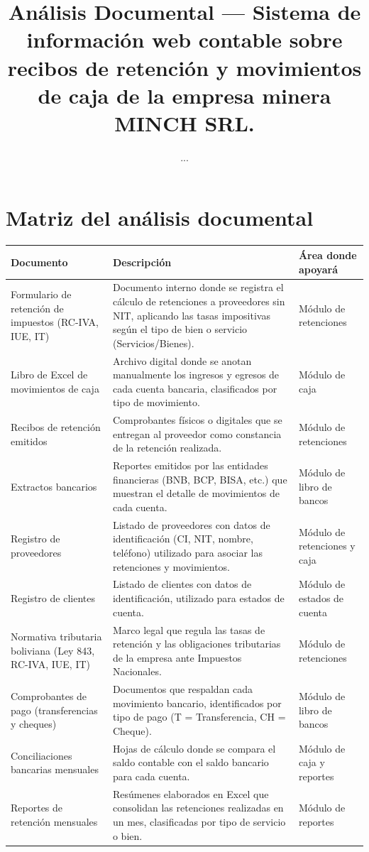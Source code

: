 \documentclass[stu]{apa7}
\title{Análisis Documental --- Sistema de información web contable sobre recibos de retención y movimientos de caja de la empresa minera MINCH SRL.}
\author{...}
\affiliation{...}
\begin{document}
\maketitle

\section{Matriz del análisis documental}

\begin{longtable}{|L{4cm}|L{6cm}|L{5cm}|}
\hline
{}
\textbf{Documento} & \textbf{Descripción} & \textbf{Área donde apoyará} \\
\hline
\endhead
Formulario de retención de impuestos (RC-IVA, IUE, IT) & Documento interno donde se registra el cálculo de retenciones a proveedores sin NIT, aplicando las tasas impositivas según el tipo de bien o servicio (Servicios/Bienes). & Módulo de retenciones \\
\hline
Libro de Excel de movimientos de caja & Archivo digital donde se anotan manualmente los ingresos y egresos de cada cuenta bancaria, clasificados por tipo de movimiento. & Módulo de caja \\
\hline
Recibos de retención emitidos & Comprobantes físicos o digitales que se entregan al proveedor como constancia de la retención realizada. & Módulo de retenciones \\
\hline
Extractos bancarios & Reportes emitidos por las entidades financieras (BNB, BCP, BISA, etc.) que muestran el detalle de movimientos de cada cuenta. & Módulo de libro de bancos \\
\hline
Registro de proveedores & Listado de proveedores con datos de identificación (CI, NIT, nombre, teléfono) utilizado para asociar las retenciones y movimientos. & Módulo de retenciones y caja \\
\hline
Registro de clientes & Listado de clientes con datos de identificación, utilizado para estados de cuenta. & Módulo de estados de cuenta \\
\hline
Normativa tributaria boliviana (Ley 843, RC-IVA, IUE, IT) & Marco legal que regula las tasas de retención y las obligaciones tributarias de la empresa ante Impuestos Nacionales. & Módulo de retenciones \\
\hline
Comprobantes de pago (transferencias y cheques) & Documentos que respaldan cada movimiento bancario, identificados por tipo de pago (T = Transferencia, CH = Cheque). & Módulo de libro de bancos \\
\hline
Conciliaciones bancarias mensuales & Hojas de cálculo donde se compara el saldo contable con el saldo bancario para cada cuenta. & Módulo de caja y reportes \\
\hline
Reportes de retención mensuales & Resúmenes elaborados en Excel que consolidan las retenciones realizadas en un mes, clasificadas por tipo de servicio o bien. & Módulo de reportes \\
\hline
\end{longtable}
\end{document}
